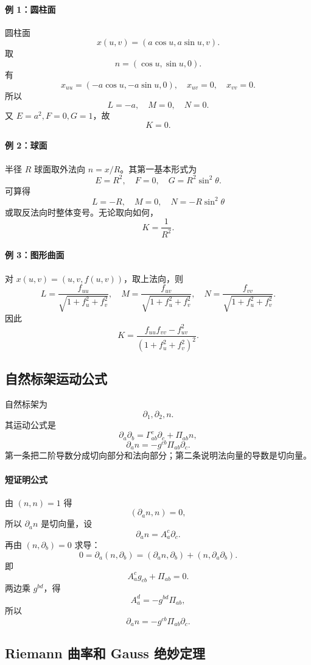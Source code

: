 \documentclass[UTF8,12pt,a4paper]{ctexart}
\begin{document}
\paragraph{例 1：圆柱面}
圆柱面
\[
x(u,v)=(a\cos u,a\sin u,v).
\]
取
\[
n=(\cos u,\sin u,0).
\]
有
\[
x_{uu}=(-a\cos u,-a\sin u,0),\quad
x_{uv}=0,\quad x_{vv}=0.
\]
所以
\[
L=-a,\quad M=0,\quad N=0.
\]
又 $E=a^2,F=0,G=1$，故
\[
K=0.
\]

\paragraph{例 2：球面}
半径 $R$ 球面取外法向 $n=x/R$。其第一基本形式为
\[
E=R^2,\quad F=0,\quad G=R^2\sin^2\theta.
\]
可算得
\[
L=-R,\quad M=0,\quad N=-R\sin^2\theta
\]
或取反法向时整体变号。无论取向如何，
\[
K=\frac{1}{R^2}.
\]

\paragraph{例 3：图形曲面}
对 $x(u,v)=(u,v,f(u,v))$，取上法向，则
\[
L=\frac{f_{uu}}{\sqrt{1+f_u^2+f_v^2}},\quad
M=\frac{f_{uv}}{\sqrt{1+f_u^2+f_v^2}},\quad
N=\frac{f_{vv}}{\sqrt{1+f_u^2+f_v^2}}.
\]
因此
\[
K=\frac{f_{uu}f_{vv}-f_{uv}^2}
{(1+f_u^2+f_v^2)^2}.
\]

\subsection{自然标架运动公式}

自然标架为
\[
\partial_1,\partial_2,n.
\]
其运动公式是
\[
\partial_a\partial_b
=\Gamma^c_{ab}\partial_c+\Pi_{ab}n,
\]
\[
\partial_a n=-g^{cb}\Pi_{ab}\partial_c.
\]
第一条把二阶导数分成切向部分和法向部分；第二条说明法向量的导数是切向量。

\paragraph{短证明公式}
由 $(n,n)=1$ 得
\[
(\partial_an,n)=0,
\]
所以 $\partial_an$ 是切向量，设
\[
\partial_an=A_a^c\partial_c.
\]
再由 $(n,\partial_b)=0$ 求导：
\[
0=\partial_a(n,\partial_b)
=(\partial_an,\partial_b)+(n,\partial_a\partial_b).
\]
即
\[
A_a^cg_{cb}+\Pi_{ab}=0.
\]
两边乘 $g^{bd}$，得
\[
A_a^d=-g^{bd}\Pi_{ab},
\]
所以
\[
\partial_an=-g^{cb}\Pi_{ab}\partial_c.
\]

\subsection{Riemann 曲率和 Gauss 绝妙定理}
\end{document}
